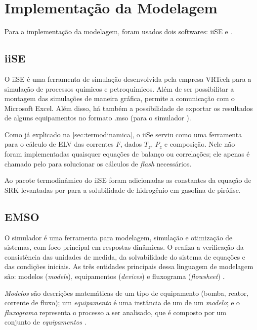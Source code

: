 \section{Implementação da Modelagem} \label{sec:implementacao}

Para a implementação da modelagem, foram usados dois softwares: iiSE e \emso. 

\subsection{iiSE} \label{sec:iise}

O iiSE é uma ferramenta de simulação desenvolvida pela empresa VRTech para a
simulação de processos químicos e petroquímicos. Além de ser possibilitar a
montagem das simulações de maneira gráfica, permite a comunicação com o
Microsoft Excel. Além disso, há também a possibilidade de exportar os resultados
de alguns equipamentos no formato .mso (para o simulador \emso).

Como já explicado na \autoref{sec:termodinamica}, o iiSe serviu como uma
ferramenta para o cálculo de ELV das correntes $F$, dados $T_z$, $P_z$ e
composição. Nele não foram implementadas quaisquer equações de balanço ou
correlações; ele apenas é chamado pelo \emso para solucionar os cálculos de
\emph{flash} necessários.

Ao pacote termodinâmico do iiSE foram adicionadas as constantes da equação de
SRK levantadas por  para a solubilidade de hidrogênio em
gasolina de pirólise.

\subsection{EMSO} \label{sec:EMSO}

O simulador \emso é uma ferramenta para modelagem, simulação e otimização de
sistemas, com foco principal em respostas dinâmicas. O \emso realiza a
verificação da consistência das unidades de medida, da solvabilidade do sistema
de equações e das condições iniciais. As três entidades principais dessa
linguagem de modelagem são: modelos (\emph{models}), equipamentos
(\emph{devices}) e fluxograma (\emph{flowsheet}) \cite{Soares2003}.

\textit{Modelos} são descrições matemáticas de um tipo de equipamento (bomba,
reator, corrente de fluxo); um \textit{equipamento} é uma instância de um de um
\textit{modelo}; e o \textit{fluxograma} representa o processo a ser analisado,
que é composto por um conjunto de \textit{equipamentos} \cite{Soares2003}.

